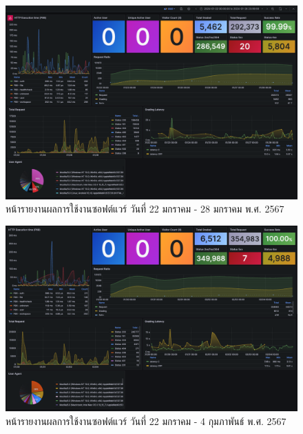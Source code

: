 \documentclass[12pt,one side,openright,a4paper]{cpe-thesis-th}
\begin{document}
\begin{figure}[H]
    \centering
    \includegraphics[width=15cm]{figure/results/grafana/grafana-jan22-jan28.png}
    \caption[หน้ารายงานผลการใช้งานซอฟต์แวร์ วันที่ 22 มกราคม - 28 มกราคม พ.ศ. 2567]{หน้ารายงานผลการใช้งานซอฟต์แวร์ วันที่ 22 มกราคม - 28 มกราคม พ.ศ. 2567}
    \label{fig:res-grafana-j22j28}
\end{figure}

\begin{figure}[H]
    \centering
    \includegraphics[width=15cm]{figure/results/grafana/grafana-jan29-feb04.png}
    \caption[หน้ารายงานผลการใช้งานซอฟต์แวร์ วันที่ 29 มกราคม - 4 กุมภาพันธ์ พ.ศ. 2567]{หน้ารายงานผลการใช้งานซอฟต์แวร์ วันที่ 22 มกราคม - 4 กุมภาพันธ์ พ.ศ. 2567}
    \label{fig:res-grafana-j29f04}
\end{figure}
\end{document}
